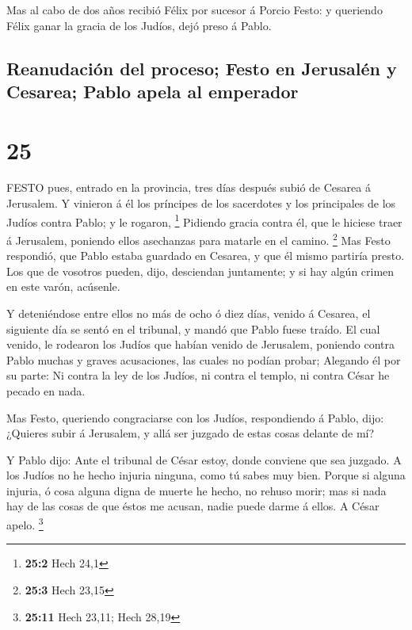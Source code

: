  Mas al cabo de dos años recibió Félix por sucesor á Porcio
Festo: y queriendo Félix ganar la gracia de los Judíos, dejó preso á
Pablo.

\hypertarget{reanudaciuxf3n-del-proceso-festo-en-jerusaluxe9n-y-cesarea-pablo-apela-al-emperador}{%
\subsection{Reanudación del proceso; Festo en Jerusalén y Cesarea; Pablo
apela al
emperador}\label{reanudaciuxf3n-del-proceso-festo-en-jerusaluxe9n-y-cesarea-pablo-apela-al-emperador}}

\hypertarget{section-24}{%
\section{25}\label{section-24}}

 FESTO pues, entrado en la provincia, tres días después
subió de Cesarea á Jerusalem.  Y vinieron á él los príncipes
de los sacerdotes y los principales de los Judíos contra Pablo; y le
rogaron, \footnote{\textbf{25:2} Hech 24,1}  Pidiendo gracia
contra él, que le hiciese traer á Jerusalem, poniendo ellos asechanzas
para matarle en el camino. \footnote{\textbf{25:3} Hech 23,15}
 Mas Festo respondió, que Pablo estaba guardado en Cesarea,
y que él mismo partiría presto.  Los que de vosotros pueden,
dijo, desciendan juntamente; y si hay algún crimen en este varón,
acúsenle.

 Y deteniéndose entre ellos no más de ocho ó diez días,
venido á Cesarea, el siguiente día se sentó en el tribunal, y mandó que
Pablo fuese traído.  El cual venido, le rodearon los Judíos
que habían venido de Jerusalem, poniendo contra Pablo muchas y graves
acusaciones, las cuales no podían probar;  Alegando él por
su parte: Ni contra la ley de los Judíos, ni contra el templo, ni contra
César he pecado en nada.

 Mas Festo, queriendo congraciarse con los Judíos,
respondiendo á Pablo, dijo: ¿Quieres subir á Jerusalem, y allá ser
juzgado de estas cosas delante de mí?

 Y Pablo dijo: Ante el tribunal de César estoy, donde
conviene que sea juzgado. A los Judíos no he hecho injuria ninguna, como
tú sabes muy bien.  Porque si alguna injuria, ó cosa alguna
digna de muerte he hecho, no rehuso morir; mas si nada hay de las cosas
de que éstos me acusan, nadie puede darme á ellos. A César apelo.
\footnote{\textbf{25:11} Hech 23,11; Hech 28,19}

